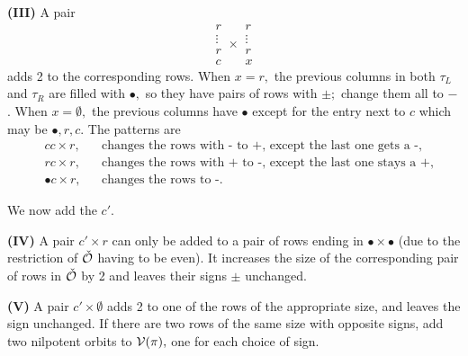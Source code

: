 \documentclass[11pt ,reqno]{amsart}
\begin{document}
\noindent\textbf{(III)} A pair 
\begin{equation}
\begin{matrix} r\\ \vdots\\ r\\ c\end{matrix}\times\begin{matrix} r\\
  \vdots\\ r\\ x\end{matrix}
\label{3.2.8}\end{equation}
adds 2 to the corresponding rows. When $x=r,$ the previous columns in
both $\tau_L$ and $\tau_R$ are filled with $\bullet,$ so they have
pairs of rows with $\pm;$  change them all to $-$.
When $x=\emptyset,$ the previous columns have
$\bullet$ except for the entry next to $c$ which may be $\bullet,r,c.$
The patterns are 
{\clrr
$$
\begin{aligned}
&cc\times r, &&\text{changes the rows with - to +, except the last one gets a -},\\
&rc\times r, &&\text{changes the rows with + to -, except the last one stays a +},\\
&\bullet c\times r, &&\text{changes the rows to -.}
\end{aligned}
$$
}

\bigskip
\noindent We now add the $c'.$ 

\noindent\textbf{(IV)} A pair $c'\times r$ can only be added to a pair
of rows ending in $\bullet\times\bullet$ (due to the restriction of ${\check {\mathcal O}}$ having to be even). It increases the size of the
corresponding pair of rows in ${\check {\mathcal O}}$ by 2 and leaves their signs $\pm$ unchanged.

\noindent\textbf{(V)} A pair $c'\times \emptyset$ adds 2 to one of the rows of the appropriate size, and leaves the sign unchanged. If there are two rows of the same
size with opposite signs, add two nilpotent orbits to ${\mathcal V}(\pi),$ one
for each choice of sign. 
\end{document}
